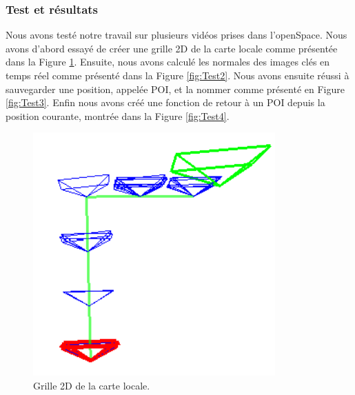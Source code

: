 \documentclass[11pt]{article}
\begin{document}
      \subsubsection{Test et résultats}
        Nous avons testé notre travail sur plusieurs vidéos prises dans l'openSpace. Nous avons d'abord essayé de créer une grille 2D de la 
        carte locale comme présentée dans la Figure \ref{fig:Test1}. Ensuite, nous avons calculé les normales des images clés en temps réel 
        comme présenté dans la Figure \ref{fig:Test2}. Nous avons ensuite réussi à sauvegarder une position, appelée POI, et la nommer comme
        présenté en Figure \ref{fig:Test3}. Enfin nous avons créé une fonction de retour à un POI depuis la position courante, montrée dans la 
        Figure \ref{fig:Test4}.      

        \begin{figure}[!tbp]
          \centering
          \begin{minipage}[t]{0.4\textwidth}
            \includegraphics[width=\textwidth]{Test1.png}    
            \caption{Grille 2D de la carte locale.}
            \label{fig:Test1}
          \end{minipage}
          \hfill 
          \begin{minipage}[t]{0.4\textwidth}

\end{minipage}
\end{figure}
\end{document}
